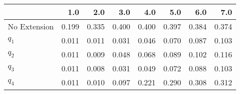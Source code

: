 \begin{tabular}{lrrrrrrr}
\toprule
{} &   1.0 &   2.0 &   3.0 &   4.0 &   5.0 &   6.0 &   7.0 \\
\midrule
No Extension & 0.199 & 0.335 & 0.400 & 0.400 & 0.397 & 0.384 & 0.374 \\
$q_1$        & 0.011 & 0.011 & 0.031 & 0.046 & 0.070 & 0.087 & 0.103 \\
$q_2$        & 0.011 & 0.009 & 0.048 & 0.068 & 0.089 & 0.102 & 0.116 \\
$q_3$        & 0.011 & 0.008 & 0.031 & 0.049 & 0.072 & 0.088 & 0.103 \\
$q_4$        & 0.011 & 0.010 & 0.097 & 0.221 & 0.290 & 0.308 & 0.312 \\
\bottomrule
\end{tabular}
